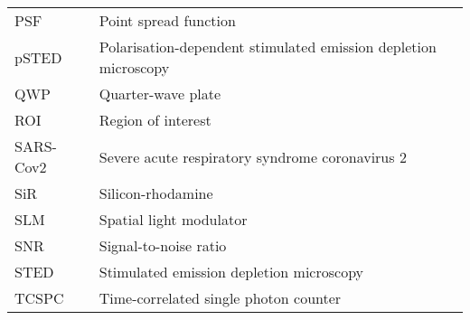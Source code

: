 \begin{tabular}{ll}
	PSF       & Point spread function                                               \\
	pSTED     & Polarisation-dependent stimulated emission depletion microscopy      \\
	QWP       & Quarter-wave plate                                                  \\
	ROI      & Region of interest                                                  \\
	SARS-Cov2 & Severe acute respiratory syndrome coronavirus 2                     \\
	SiR       & Silicon-rhodamine                                                   \\
	SLM       & Spatial light modulator                                             \\
	SNR       & Signal-to-noise ratio                                               \\
	STED      & Stimulated emission depletion  microscopy                           \\
	TCSPC     & Time-correlated single photon counter
\end{tabular}